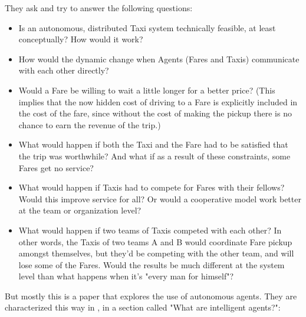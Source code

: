 \documentclass[11pt,letterpaper,onecolumn,twoside,openright,draft]{report}
\begin{document}
They ask and try to answer the following questions:
\begin{itemize}
  \item{Is an autonomous, distributed Taxi system technically feasible, at least conceptually?
    How would it work?}
  \item{How would the dynamic change when Agents (Fares and Taxis) communicate with each other directly?}
  \item{Would a Fare be willing to wait a little longer for a better price?
    (This implies that the now hidden cost of driving to a Fare is explicitly included in the cost of the fare, since without the cost of making the pickup there is no chance to earn the revenue of the trip.)}
  \item{What would happen if both the Taxi and the Fare had to be satisfied that the trip was worthwhile?
    And what if as a result of these constraints, some Fares get no service?}
  \item{What would happen if Taxis had to compete for Fares with their fellows?
    Would this improve service for all?
    Or would a cooperative model work better at the team or organization level?}
  \item{What would happen if two teams of Taxis competed with each other?
    In other words, the Taxis of two teams A and B would coordinate Fare pickup amongst themselves, but they’d be competing with the other team, and will lose some of the Fares.
    Would the results be much different at the system level than what happens when it’s "every man for himself"?}
\end{itemize}

But mostly this is a paper that explores the use of autonomous agents.
They are characterized this way in \cite{roozemond2000act}, in a section called "What are intelligent agents?":

\end{document}
